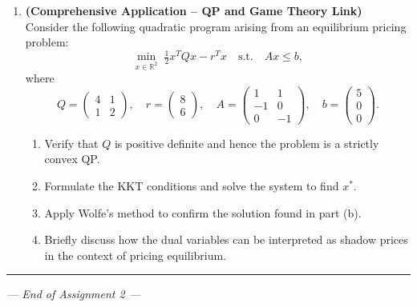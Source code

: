 \documentclass[12pt,a4paper]{article}
\begin{document}
\begin{enumerate}[leftmargin=*, label=\textbf{Q.\arabic*.}]
\item \textbf{(Comprehensive Application -- QP and Game Theory Link)}\\
  Consider the following quadratic program arising from an equilibrium pricing
  problem:
  \[
    \min_{x \in \mathbb{R}^2}\; \tfrac{1}{2}x^T Q x - r^T x \quad\text{s.t.}\quad Ax \le b,
  \]
  where
  \[
    Q = \begin{pmatrix} 4 & 1 \\ 1 & 2 \end{pmatrix},\quad
    r = \begin{pmatrix} 8 \\ 6 \end{pmatrix},\quad
    A = \begin{pmatrix} 1 & 1 \\ -1 & 0 \\ 0 & -1 \end{pmatrix},\quad
    b = \begin{pmatrix} 5 \\ 0 \\ 0 \end{pmatrix}.
  \]
  \begin{enumerate}[label=(\alph*)]
    \item Verify that $Q$ is positive definite and hence the problem is a
          strictly convex QP.
    \item Formulate the KKT conditions and solve the system to find $x^*$.
    \item Apply Wolfe's method to confirm the solution found in part (b).
    \item Briefly discuss how the dual variables can be interpreted as shadow
          prices in the context of pricing equilibrium.
  \end{enumerate}

\end{enumerate}

\medskip\hrule\medskip
\begin{center}
  \textit{--- End of Assignment 2 ---}
\end{center}
\end{document}
